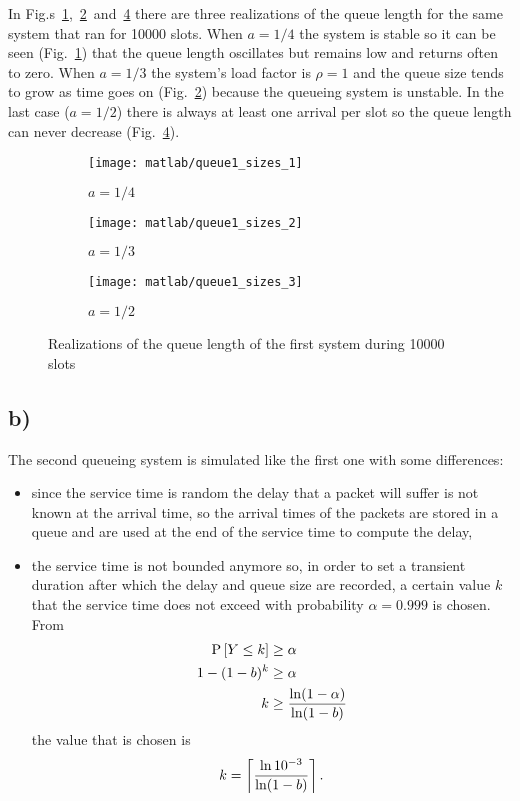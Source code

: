 \documentclass[a4paper,oneside]{article}
\begin{document}
In
Fig.s~\ref{plot:queue1_sizes_stable},~\ref{plot:queue1_sizes_limit}~and~\ref{plot:queue1_sizes_unstable}
there are three realizations of the queue length for the same system
that ran for 10000 slots. When $a = 1/4$ the system is stable so it
can be seen (Fig.~\ref{plot:queue1_sizes_stable}) that the queue
length oscillates but remains low and returns often to zero. When $a =
1/3$ the system's load factor is $\rho = 1$ and the queue size tends
to grow as time goes on (Fig.~\ref{plot:queue1_sizes_limit}) because
the queueing system is unstable. In the last case ($a = 1/2$) there is
always at least one arrival per slot so the queue length can never
decrease (Fig.~\ref{plot:queue1_sizes_unstable}).
\begin{figure}[htbp]
  \centering
  \begin{subfigure}{0.5\textwidth}
    \centering
    \texttt{[image: matlab/queue1\_sizes\_1]}
    \caption{$ a = 1/4 $}
    \label{plot:queue1_sizes_stable}
  \end{subfigure}%
  \begin{subfigure}{0.5\textwidth}
    \centering
    \texttt{[image: matlab/queue1\_sizes\_2]}
    \caption{$ a = 1/3 $}
    \label{plot:queue1_sizes_limit}
  \end{subfigure}
  \begin{subfigure}{0.5\textwidth}
    \centering
    \texttt{[image: matlab/queue1\_sizes\_3]}
    \caption{$ a = 1/2 $}
    \label{plot:queue1_sizes_unstable}
  \end{subfigure}
  \caption{Realizations of the queue length of the first system during
    10000 slots}
\end{figure}

\subsection*{b)}
The second queueing system is simulated like the first one with some
differences:
\begin{itemize}
  \item since the service time is random the delay that a packet will
    suffer is not known at the arrival time, so the arrival times of
    the packets are stored in a queue and are used at the end of the
    service time to compute the delay,
  \item the service time is not bounded anymore so, in order to set a
    transient duration after which the delay and queue size are
    recorded, a certain value $k$ that the service time does not
    exceed with probability $\alpha = 0.999$ is chosen. From
    \begin{align}
      \operatorname{P}\left[Y \leq k\right] & \geq \alpha \\
      1-(1-b)^k & \geq \alpha \\
      k & \geq \frac{\ln(1-\alpha)}{\ln(1-b)}
    \end{align}
    the value that is chosen is
    \begin{equation}
      k = \left\lceil\frac{\ln10^{-3}}{\ln(1-b)}\right\rceil .
    \end{equation}
\end{itemize}
\end{document}
